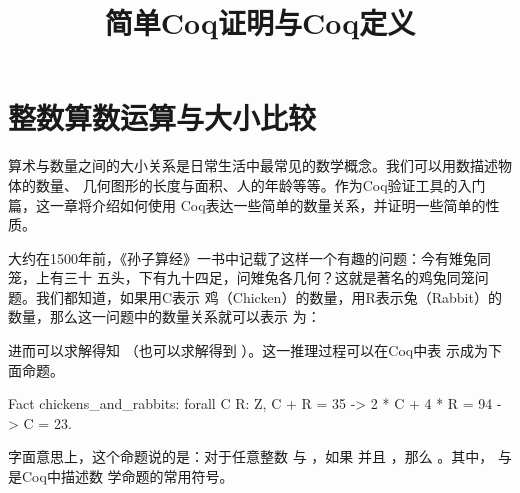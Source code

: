 \documentclass{article}[margin=1pt]
\title{简单Coq证明与Coq定义}
\author{}
\date{}
\theoremstyle{definition}
\begin{document}
\maketitle

\section{整数算数运算与大小比较 }



 算术与数量之间的大小关系是日常生活中最常见的数学概念。我们可以用数描述物体的数量、
    几何图形的长度与面积、人的年龄等等。作为Coq验证工具的入门篇，这一章将介绍如何使用
    Coq表达一些简单的数量关系，并证明一些简单的性质。

 大约在1500年前，《孙子算经》一书中记载了这样一个有趣的问题：今有雉兔同笼，上有三十 
    五头，下有九十四足，问雉兔各几何？这就是著名的鸡兔同笼问题。我们都知道，如果用C表示
    鸡（Chicken）的数量，用R表示兔（Rabbit）的数量，那么这一问题中的数量关系就可以表示
    为：
\begin{quotation}



\end{quotation}
 进而可以求解得知  （也可以求解得到  ）。这一推理过程可以在Coq中表
    示成为下面命题。

\begin{mytext1}
Fact chickens_and_rabbits: forall C R: Z,
  C + R = 35 ->
  2 * C + 4 * R = 94 ->
  C = 23.



\end{mytext1}
\noindent
 字面意思上，这个命题说的是：对于任意整数  与  ，如果  并且
      ，那么  。其中，  与  是Coq中描述数
    学命题的常用符号。
\end{document}
